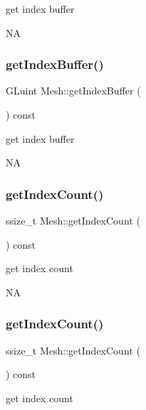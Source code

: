 get index buffer

NA \mbox{\label{classMesh_a2b30616b2101f88ffdbef2720538f9d6}} 
\subsubsection{\texorpdfstring{get\+Index\+Buffer()}{getIndexBuffer()}\hspace{0.1cm}{\footnotesize\ttfamily [2/2]}}
{\footnotesize\ttfamily G\+Luint Mesh\+::get\+Index\+Buffer (\begin{DoxyParamCaption}{ }\end{DoxyParamCaption}) const}

get index buffer

NA \mbox{\label{classMesh_a7ae6ed2eb06a5cbf4f3154b7fa668a4d}} 
\subsubsection{\texorpdfstring{get\+Index\+Count()}{getIndexCount()}\hspace{0.1cm}{\footnotesize\ttfamily [1/2]}}
{\footnotesize\ttfamily ssize\+\_\+t Mesh\+::get\+Index\+Count (\begin{DoxyParamCaption}{ }\end{DoxyParamCaption}) const}

get index count

NA \mbox{\label{classMesh_a7ae6ed2eb06a5cbf4f3154b7fa668a4d}} 
\subsubsection{\texorpdfstring{get\+Index\+Count()}{getIndexCount()}\hspace{0.1cm}{\footnotesize\ttfamily [2/2]}}
{\footnotesize\ttfamily ssize\+\_\+t Mesh\+::get\+Index\+Count (\begin{DoxyParamCaption}{ }\end{DoxyParamCaption}) const}

get index count

